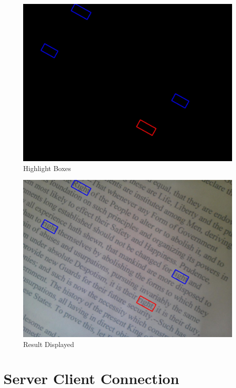 \documentclass[conference]{IEEEtran}
\begin{document}
\begin{figure}
\center
\includegraphics[scale=0.15]{bb_mask_inv_cropped.jpg}
\caption{Highlight Boxes}
\label{boxes_overlay}
\end{figure}

\begin{figure}
\center
\includegraphics[scale=0.15]{result_image.jpg}
\caption{Result Displayed}
\label{result_image}
\end{figure}


\section{Server Client Connection}
\end{document}
